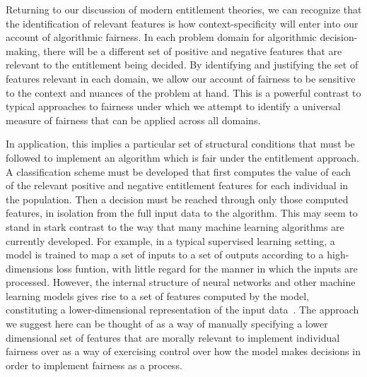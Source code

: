 Returning to our discussion of modern entitlement theories, we can recognize
that the identification of relevant features is how context-specificity will
enter into our account of algorithmic fairness. In each problem domain for 
algorithmic decision-making, there will be a different set of positive and
negative features that are relevant to the entitlement being decided. By
identifying and justifying the set of features relevant in each domain, we
allow our account of fairness to be sensitive to the context and nuances of the
problem at hand. This is a powerful contrast to typical approaches to fairness
under which we attempt to identify a universal measure of fairness that can be
applied across all domains.

In application, this implies a particular set of structural conditions that must
be followed to implement an algorithm which is fair under the entitlement
approach. A classification scheme must be developed that first computes the
value of each of the relevant positive and negative entitlement features for
each individual in the population. Then a decision must be reached through only
those computed features, in isolation from the full input data to the algorithm.
This may seem to stand in stark contrast to the way that many machine learning
algorithms are currently developed. For example, in a typical supervised
learning setting, a model is trained to map a set of inputs to a set of outputs
according to a high-dimensions loss funtion, with little regard for the
manner in which the inputs are processed. However, the internal structure of
neural networks and other machine learning models gives rise to a set of
features computed by the model, constituting a lower-dimensional representation
of the input data~\citep{Liu_2018}. The approach we suggest here can be thought
of as a way of manually specifying a lower dimensional set of features that
are morally relevant to implement individual fairness over as a way of
exercising control over how the model makes decisions in order to implement
fairness as a process.

